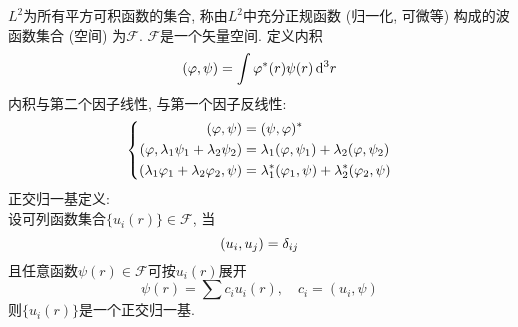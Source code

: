 \documentclass[UTF8]{ctexart}
\numberwithin{equation}{subsection}
\begin{document}
$L^2$为所有平方可积函数的集合, 称由$L^2$中充分正规函数 (归一化, 可微等) 构成的波函数集合 (空间) 为$\mathscr{F}$. 
$\mathscr{F}$是一个矢量空间. 
定义内积
$$(\varphi,\psi)=\int\varphi^*(r)\psi(r)\mathop{}\!\mathrm{d}^3r$$
内积与第二个因子线性, 与第一个因子反线性:
$$\left\{\begin{aligned} 
    (\varphi,\psi)&=(\psi,\varphi)^*\\
    (\varphi,\lambda_1\psi_1+\lambda_2\psi_2)&=\lambda_1(\varphi,\psi_1)+\lambda_2(\varphi,\psi_2)\\
    (\lambda_1\varphi_1+\lambda_2\varphi_2,\psi) &= \lambda_1^*(\varphi_1,\psi)+\lambda_2^*(\varphi_2,\psi)\\
 \end{aligned}\right.$$
正交归一基定义:\\
设可列函数集合$\{u_i(r)\}\in\mathscr{F}$, 当
$$(u_i,u_j)=\delta_{ij}$$
且任意函数$\psi(r)\in\mathscr{F}$可按$u_i(r)$展开
$$\psi(r)=\sum c_iu_i(r),\quad c_i=(u_i,\psi)$$
则$\{u_i(r)\}$是一个正交归一基. 
\end{document}
